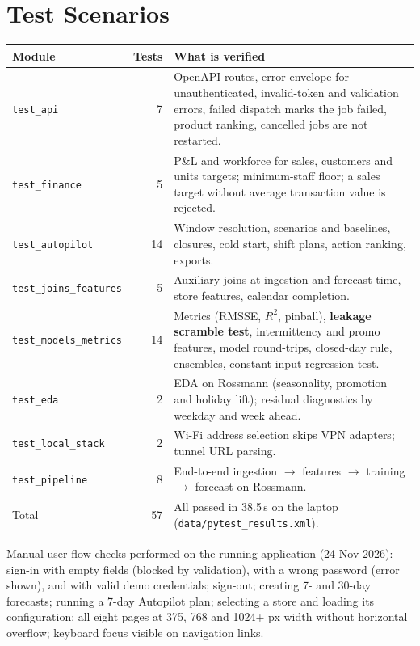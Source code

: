 \documentclass[conference]{IEEEtran}
\newcommand{\code}[1]{\texttt{\small #1}}
\begin{document}
\section{Test Scenarios}\label{app:tests}
\begin{center}
\small
\begin{tabular}{@{}p{}rp{}@{}}
\toprule
Module & Tests & What is verified \\
\midrule
\code{test\_api} & 7 & OpenAPI routes, error envelope for unauthenticated, invalid-token and validation errors, failed dispatch marks the job failed, product ranking, cancelled jobs are not restarted. \\
\code{test\_finance} & 5 & P\&L and workforce for sales, customers and units targets; minimum-staff floor; a sales target without average transaction value is rejected. \\
\code{test\_autopilot} & 14 & Window resolution, scenarios and baselines, closures, cold start, shift plans, action ranking, exports. \\
\code{test\_joins\_features} & 5 & Auxiliary joins at ingestion and forecast time, store features, calendar completion. \\
\code{test\_models\_metrics} & 14 & Metrics (RMSSE, $R^2$, pinball), \textbf{leakage scramble test}, intermittency and promo features, model round-trips, closed-day rule, ensembles, constant-input regression test. \\
\code{test\_eda} & 2 & EDA on Rossmann (seasonality, promotion and holiday lift); residual diagnostics by weekday and week ahead. \\
\code{test\_local\_stack} & 2 & Wi-Fi address selection skips VPN adapters; tunnel URL parsing. \\
\code{test\_pipeline} & 8 & End-to-end ingestion $\rightarrow$ features $\rightarrow$ training $\rightarrow$ forecast on Rossmann. \\
\midrule
Total & 57 & All passed in 38.5\,s on the laptop (\code{data/pytest\_results.xml}). \\
\bottomrule
\end{tabular}
\end{center}

Manual user-flow checks performed on the running application (24 Nov 2026): sign-in with empty
fields (blocked by validation), with a wrong password (error shown), and with valid demo credentials;
sign-out; creating 7- and 30-day forecasts; running a 7-day Autopilot plan; selecting a store and
loading its configuration; all eight pages at 375, 768 and 1024+ px width without horizontal
overflow; keyboard focus visible on navigation links.
\end{document}
